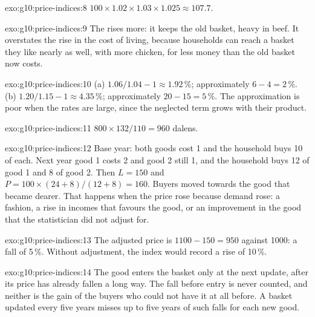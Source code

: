 \begin{solution}{exo:g10:price-indices:8}
$100 \times 1.02 \times 1.03 \times 1.025 \approx 107.7$.
\end{solution}

\begin{solution}{exo:g10:price-indices:9}
The  rises more: it keeps the old basket, heavy in beef. It overstates the rise in the cost of living, because households can reach a basket they like
nearly as well, with more chicken, for less money than the old basket now costs.
\end{solution}

\begin{solution}{exo:g10:price-indices:10}
(a) $1.06/1.04 - 1 \approx 1.92\,\%$; approximately $6 - 4 = 2\,\%$. (b) $1.20/1.15 - 1 \approx 4.35\,\%$; approximately $20 - 15 = 5\,\%$. The approximation is poor when the
rates are large, since the neglected term grows with their product.
\end{solution}

\begin{solution}{exo:g10:price-indices:11}
$800 \times 132/110 = 960$ dalens.
\end{solution}

\begin{solution}{exo:g10:price-indices:12}
Base year: both goods cost 1 and the household buys 10 of each. Next year good 1 costs 2 and good 2 still 1, and the household buys 12 of good 1 and 8 of good 2. Then $L =
150$ and $P = 100 \times (24 + 8)/(12 + 8) = 160$. Buyers moved towards the good that became dearer. That happens when the price rose because demand rose: a fashion, a
rise in incomes that favours the good, or an improvement in the good that the statistician did not adjust for.
\end{solution}

\begin{solution}{exo:g10:price-indices:13}
The adjusted price is $1100 - 150 = 950$ against 1000: a fall of 5\,\%. Without adjustment, the index would record a rise of 10\,\%.
\end{solution}

\begin{solution}{exo:g10:price-indices:14}
The good enters the basket only at the next update, after its price has already fallen a long way. The fall before entry is never counted, and neither is the gain of the
buyers who could not have it at all before. A basket updated every five years misses up to five years of such falls for each new good.
\end{solution}


